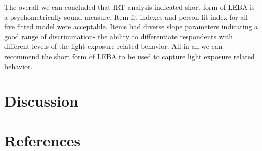\documentclass[
  english,
  man]{apa6}
\begin{document}
The overall we can concluded that IRT analysis indicated short form of LEBA is a psychometrically sound measure. Item fit indexes and person fit index for all five fitted model were acceptable. Items had diverse slope parameters indicating a good range of discrimination- the ability to differentiate respondents with different levels of the light exposure related behavior. All-in-all we can recommend the short form of LEBA to be used to capture light exposure related behavior.

\hypertarget{discussion}{%
\section{Discussion}\label{discussion}}

\newpage

\hypertarget{references}{%
\section{References}\label{references}}

\begingroup
\setlength{\parindent}{-0.5in}
\setlength{\leftskip}{0.5in}
\end{document}
